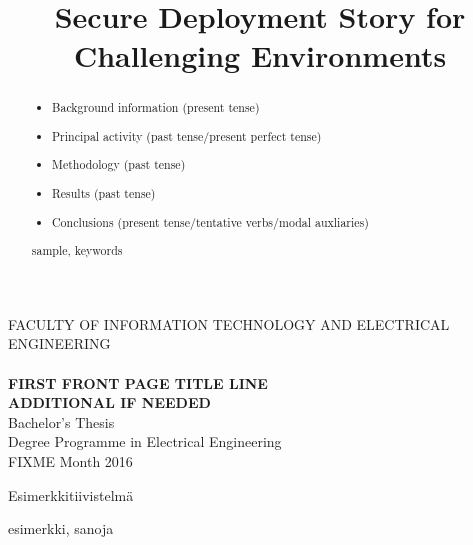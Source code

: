 \documentclass[a4paper, 12pt,titlepage]{dithesis}
\title{Secure Deployment Story for Challenging Environments}
\begin{document}
\begin{titlepage}
	{{\small FACULTY OF INFORMATION TECHNOLOGY AND ELECTRICAL ENGINEERING}\\}
	\vspace{65 mm}
	{\textbf{\LARGE \getfirstname\ \getlastname }\\}
	\vspace{15 mm}
	{\textbf{\LARGE FIRST FRONT PAGE TITLE LINE\\ADDITIONAL IF NEEDED\\}}
	\vspace{70 mm}
	{\large {Bachelor's Thesis}\\}
	{\large {Degree Programme in Electrical Engineering}\\}
	{\large {FIXME Month 2016}\\}
\end{titlepage}


\begin{abstract}

\begin{itemize}
\item Background information (present tense)
\item Principal activity (past tense/present perfect tense)
\item Methodology (past tense)
\item Results (past tense)
\item Conclusions (present tense/tentative verbs/modal auxliaries)
\end{itemize}

\keywords sample, keywords
\end{abstract}

\begin{tiivistelma}
Esimerkkitiivistelmä

\avainsanat esimerkki, sanoja
\end{tiivistelma}
\end{document}
